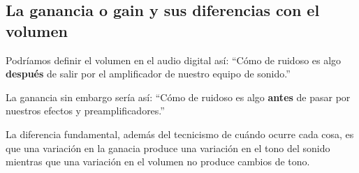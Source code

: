 \subsection{La ganancia o gain y sus diferencias con el volumen}\label{sec:Gain}

Podríamos definir el volumen en el audio digital así: ``Cómo de ruidoso es algo \textbf{después} de salir por el amplificador de nuestro equipo de sonido.'' 

La ganancia sin embargo sería así: ``Cómo de ruidoso es algo \textbf{antes} de pasar por nuestros efectos y preamplificadores.''

La diferencia fundamental, además del tecnicismo de cuándo ocurre cada cosa, es que una variación en la ganacia produce una variación en el tono del sonido mientras que una variación en el volumen no produce cambios de tono.





